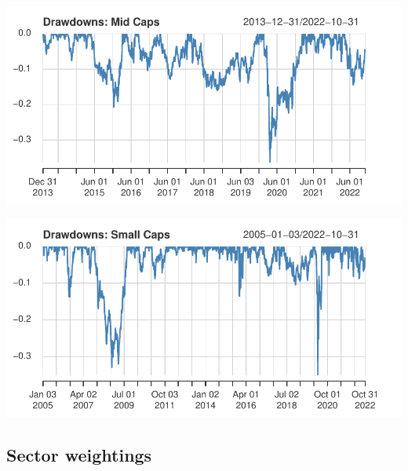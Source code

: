 \documentclass[11pt,preprint, authoryear]{elsarticle}
\let\origfigure\figure
\let\endorigfigure\endfigure
\renewenvironment{figure}[1][2] {
    \expandafter\origfigure\expandafter[H]
} {
    \endorigfigure
}
\numberwithin{equation}{section}
\numberwithin{figure}{section}
\numberwithin{table}{section}
\begin{document}
\begin{figure}[H]

{\centering \includegraphics{Volatility-of-Shares_files/figure-latex/Figure2-1} 

}

\caption{Mid Cap drawdown chart \label{Figure2}}\label{fig:Figure2}
\end{figure}

\begin{figure}[H]

{\centering \includegraphics{Volatility-of-Shares_files/figure-latex/Figure3-1} 

}

\caption{Small Cap drawdown chart \label{Figure3}}\label{fig:Figure3}
\end{figure}

\hypertarget{sector-weightings}{%
\subsection{Sector weightings}\label{sector-weightings}}
\end{document}
